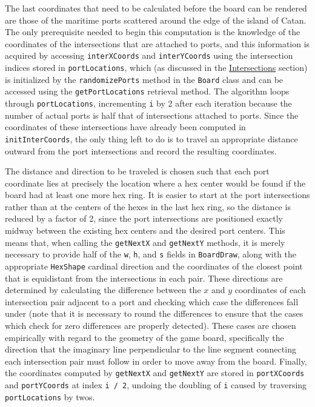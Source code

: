 \documentclass[pageno]{jpaper}
\begin{document}
\begin{doublespacing}
The last coordinates that need to be calculated before the board can be rendered are those of the maritime ports scattered around the edge of the island of Catan. The only prerequisite needed to begin this computation is the knowledge of the coordinates of the intersections that are attached to ports, and this information is acquired by accessing \lstinline$interXCoords$ and \lstinline$interYCoords$ using the intersection indices stored in \lstinline$portLocations$, which (as discussed in the \hyperlink{sec:intersections}{Intersections} section) is initialized by the \lstinline$randomizePorts$ method in the \lstinline$Board$ class and can be accessed using the \lstinline$getPortLocations$ retrieval method. The algorithm loops through \lstinline$portLocations$, incrementing \lstinline$i$ by 2 after each iteration because the number of actual ports is half that of intersections attached to ports. Since the coordinates of these intersections have already been computed in \lstinline$initInterCoords$, the only thing left to do is to travel an appropriate distance outward from the port intersections and record the resulting coordinates. 

The distance and direction to be traveled is chosen such that each port coordinate lies at precisely the location where a hex center would be found if the board had at least one more hex ring. It is easier to start at the port intersections rather than at the centers of the hexes in the last hex ring, so the distance is reduced by a factor of 2, since the port intersections are positioned exactly midway between the existing hex centers and the desired port centers. This means that, when calling the \lstinline$getNextX$ and \lstinline$getNextY$ methods, it is merely necessary to provide half of the \lstinline$w$, \lstinline$h$, and \lstinline$s$ fields in \lstinline$BoardDraw$, along with the appropriate \lstinline$HexShape$ cardinal direction and the coordinates of the closest point that is equidistant from the intersections in each pair. These directions are determined by calculating the difference between the $x$ and $y$ coordinates of each intersection pair adjacent to a port and checking which case the differences fall under (note that it is necessary to round the differences to ensure that the cases which check for zero differences are properly detected). These cases are chosen empirically with regard to the geometry of the game board, specifically the direction that the imaginary line perpendicular to the line segment connecting each intersection pair must follow in order to move away from the board. Finally, the coordinates computed by \lstinline$getNextX$ and \lstinline$getNextY$ are stored in \lstinline$portXCoords$ and \lstinline$portYCoords$ at index \lstinline$i / 2$, undoing the doubling of \lstinline$i$ caused by traversing \lstinline$portLocations$ by twos.


\end{doublespacing}
\end{document}
